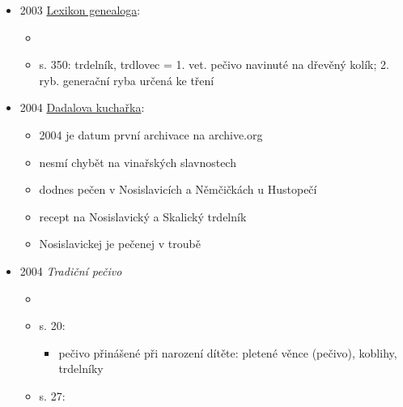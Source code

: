\begin{itemize}
  \begin{itemize}
  \tightlist
  \item
    článek o Daně Partykové-Wurstové, tvůrkyni uměleckých figurek z
    těsta,
  \item
    vídala babičku, jak připravuje trdelníky, pégny, malé koláčky se
    sypánkovými drdůlky
  \item
    narodila se v roce 1936
  \end{itemize}
\item
  2003
  \href{https://www.digitalniknihovna.cz/mzk/uuid/uuid:3d951250-b066-11e4-a7a2-005056827e51}{Lexikon
  genealoga}:

  \begin{itemize}
  \tightlist
  \item
  \item
    s. 350: trdelník, trdlovec = 1. vet. pečivo navinuté na dřevěný
    kolík; 2. ryb. generační ryba určená ke tření
  \end{itemize}
\item
  2004
  \href{https://dadala.hyperlinx.cz/hypsladkuch/ost/ostr0025.html}{Dadalova
  kuchařka}:

  \begin{itemize}
  \tightlist
  \item
    2004 je datum první archivace na archive.org
  \item
    nesmí chybět na vinařských slavnostech
  \item
    dodnes pečen v Nosislavicích a Němčičkách u Hustopečí
  \item
    recept na Nosislavický a Skalický trdelník
  \item
    Nosislavickej je pečenej v troubě
  \end{itemize}
\item
  2004 \emph{Tradiční pečivo}

  \begin{itemize}
  \tightlist
  \item
     
  \item
    s. 20:

    \begin{itemize}
    \tightlist
    \item
      pečivo přinášené při narození dítěte: pletené věnce (pečivo),
      koblihy, trdelníky
    \end{itemize}
  \item
    s. 27:


\end{itemize}
\end{itemize}
